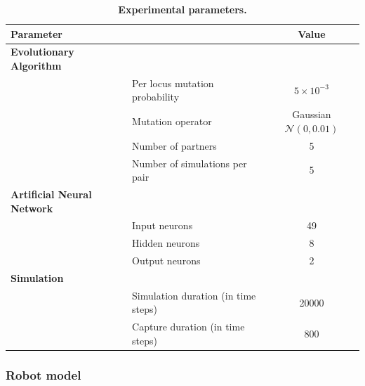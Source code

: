     \begin{table}[ht]
      \centerfloat
        \begin{tabular}{|l|l|c|}
          \hline
          \multicolumn{2}{|l|}{\textbf{Parameter}} & \textbf{Value} \\
          \hline
          \hline
          \textbf{Evolutionary Algorithm} & & \\
          \hline
          & Per locus mutation probability & \(5 \times 10^{-3}\) \\
          \hline
          & Mutation operator & Gaussian \(\mathcal{N}(0, 0.01)\) \\
          \hline
          & Number of partners & 5 \\
          \hline
          & Number of simulations per pair & 5 \\
          \hline

          \textbf{Artificial Neural Network} & & \\
          \hline
          & Input neurons & 49 \\
          \hline
          & Hidden neurons & 8 \\
          \hline
          & Output neurons & 2 \\
          \hline

          \textbf{Simulation} & & \\
          \hline
          & Simulation duration (in time steps) & 20000 \\
          \hline
          & Capture duration (in time steps) & 800 \\
          \hline
        \end{tabular}
        \caption{\textbf{Experimental parameters.}}
      \label{table:tableParametersIntro}
    \end{table}

    \subsubsection{Robot model} 

